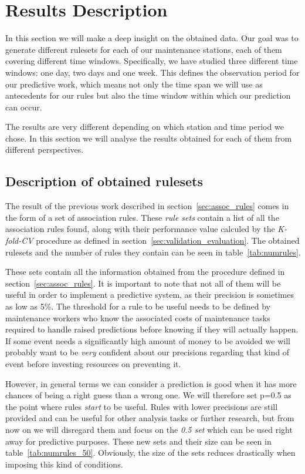 \clearpage
\chapter{Results Description}
\label{chap:results}
In this section we will make a deep insight on the obtained data. Our goal was to generate different rulesets for each of our maintenance stations, each of them covering different time windows. Specifically, we have studied three different time windows: one day, two days and one week. This defines the observation period for our predictive work, which means not only the time span we will use as antecedents for our rules but also the time window within which our prediction can occur.

The results are very different depending on which station and time period we chose. In this section we will analyse the results obtained for each of them from different perspectives.

\section{Description of obtained rulesets}
\label{sec:desc_results}
The result of the previous work described in section~\ref{sec:assoc_rules} comes in the form of a set of association rules. These \emph{rule sets} contain a list of all the association rules found, along with their performance value calculed by the \emph{K-fold-CV} procedure as defined in section~\ref{sec:validation_evaluation}. The obtained rulesets and the number of rules they contain can be seen in table~\ref{tab:numrules}.

These sets contain all the information obtained from the procedure defined in section~\ref{sec:assoc_rules}. It is important to note that not all of them will be useful in order to implement a predictive system, as their precision is sometimes as low as 5\%. The threshold for a rule to be useful needs to be defined by maintenance workers who know the associated costs of maintenance tasks required to handle raised predictions before knowing if they will actually happen. If some event needs a significantly high amount of money to be avoided we will probably want to be \emph{very} confident about our precisions regarding that kind of event before investing resources on preventing it.

However, in general terms we can consider a prediction is good when it has more chances of being a right guess than a wrong one. We will therefore set p=0.5 as the point where rules \emph{start} to be useful. Rules with lower precisions are still provided and can be useful for other analysis tasks or further research, but from now on we will disregard them and focus on the \emph{0.5 set} which can be used right away for predictive purposes. These new sets and their size can be seen in table~\ref{tab:numrules_50}. Obviously, the size of the sets reduces drastically when imposing this kind of conditions.

